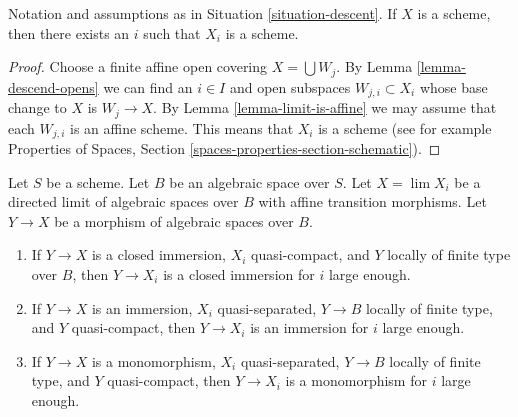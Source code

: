 \begin{lemma}
\label{lemma-limit-is-scheme}
Notation and assumptions as in Situation \ref{situation-descent}.
If $X$ is a scheme, then there exists an $i$ such that $X_i$ is a scheme.
\end{lemma}

\begin{proof}
Choose a finite affine open covering $X = \bigcup W_j$.
By Lemma \ref{lemma-descend-opens}
we can find an $i \in I$ and open subspaces $W_{j, i} \subset X_i$
whose base change to $X$ is $W_j \to X$. By
Lemma \ref{lemma-limit-is-affine} we may assume that
each $W_{j, i}$ is an affine scheme. This means that $X_i$
is a scheme (see for example
Properties of Spaces, Section \ref{spaces-properties-section-schematic}).
\end{proof}

\begin{lemma}
\label{lemma-finite-type-eventually-closed}
Let $S$ be a scheme. Let $B$ be an algebraic space over $S$.
Let $X = \lim X_i$ be a directed limit of
algebraic spaces over $B$ with affine transition morphisms.
Let $Y \to X$ be a morphism of algebraic spaces over $B$.
\begin{enumerate}
\item If $Y \to X$ is a closed immersion, $X_i$ quasi-compact, and $Y$
locally of finite type over $B$, then $Y \to X_i$ is a closed immersion
for $i$ large enough.
\item If $Y \to X$ is an immersion, $X_i$ quasi-separated, $Y \to B$
locally of finite type, and $Y$ quasi-compact, then $Y \to X_i$ is an
immersion for $i$ large enough.
\item If $Y \to X$ is a monomorphism, $X_i$ quasi-separated,
$Y \to B$ locally of finite type, and $Y$ quasi-compact, then
$Y \to X_i$ is a monomorphism for $i$ large enough.
\end{enumerate}
\end{lemma}

